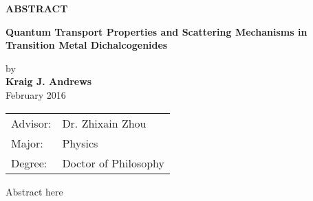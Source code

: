 \begin{center}
\textbf{ABSTRACT}
	
	
	\singlespacing
\textbf{Quantum Transport Properties and Scattering Mechanisms in Transition Metal Dichalcogenides}\\
	\doublespacing
	
	by\\
	
	\textbf{Kraig J. Andrews}\\
	February 2016\\
\end{center}
\begin{tabular}{ll}	
Advisor: & Dr. Zhixain Zhou\\
Major:   &Physics\\
Degree:  &Doctor of Philosophy
\end{tabular}
\bigskip

Abstract here
